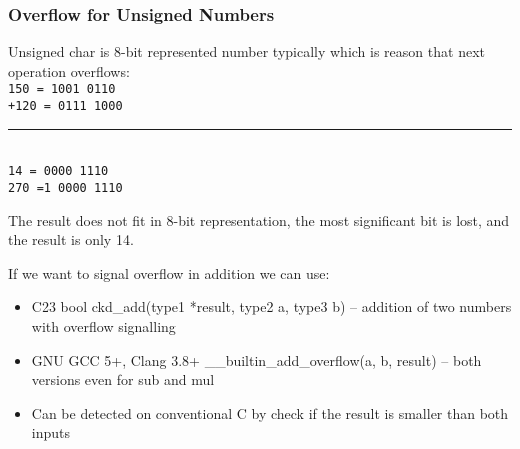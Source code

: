 \documentclass{beamer}
\begin{document}
\begin{frame}
\frametitle{Overflow for Unsigned Numbers}


Unsigned char is 8-bit represented number typically which is reason that next operation overflows:\\
\texttt{\phantom{x}150 = \phantom{x}1001 0110}\\
\texttt{+120 = \phantom{x}0111 1000}\vspace{-6pt}\\
\rule[0pt]{3.6cm}{0.4pt}\\
\texttt{\phantom{xx}14 = \phantom{x}0000 1110}\\
\texttt{\phantom{x}270 =1 0000 1110}

The result does not fit in 8-bit representation, the most significant bit is lost, and the result is only 14.

If we want to signal overflow in addition we can use:
\begin{itemize}
\item C23 bool ckd\_add(type1 *result, type2 a, type3 b) -- addition of two numbers with overflow signalling
\item GNU GCC 5+, Clang 3.8+ \_\_builtin\_add\_overflow(a, b, result) -- both versions even for sub and mul
\item Can be detected on conventional C by check if the result is smaller than both inputs
\end{itemize}
\end{frame}
\end{document}
